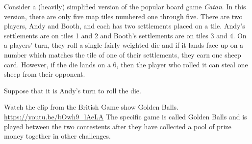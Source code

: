 \documentclass[addpoints]{exam}
\begin{document}
\begin{questions}

\newpage



\question%

Consider a (heavily) simplified version of the popular board game \textit{Catan}.
In this version, there are only five map tiles numbered one through five.
There are two players, Andy and Booth, and each has two settlements placed on a tile.
Andy's settlements are on tiles 1 and 2 and Booth's settlements are on tiles 3 and 4.
On a players' turn, they roll a single fairly weighted die and if it lands face up on a number which matches the tile of one of their settlements, they earn one sheep card.
However, if the die lands on a 6, then the player who rolled it can steal one sheep from their opponent.

Suppose that it is Andy's turn to roll the die.



\question

Watch the clip from the British Game show Golden Balls.
\url{https://youtu.be/bOwh9_lAeLA}
The specific game is called Golden Balls and is played between the two contestents after they have collected a pool of prize money together in other challenges.


\end{questions}
\end{document}
